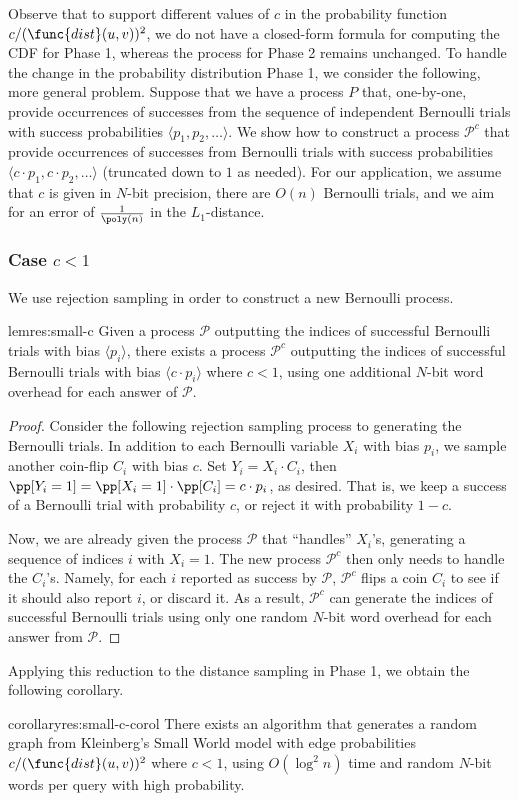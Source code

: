 Observe that to support different values of $c$ in the probability function $c/(\func{dist}(u,v))^2$, we do not have a closed-form formula for computing the CDF for Phase 1, whereas the process for Phase 2 remains unchanged. To handle the change in the probability distribution Phase 1, we consider the following, more general problem. Suppose that we have a process $P$ that, one-by-one, provide occurrences of successes from the sequence of independent Bernoulli trials with success probabilities $\langle p_1, p_2, \ldots \rangle$. We show how to construct a process $\mathcal{P}^c$ that provide occurrences of successes from Bernoulli trials with success probabilities $\langle c\cdot p_1, c\cdot p_2, \ldots\rangle$ (truncated down to $1$ as needed). For our application, we assume that $c$ is given in $N$-bit precision, there are $O(n)$ Bernoulli trials, and we aim for an error of $\frac{1}{\poly(n)}$ in the $L_1$-distance.

\subsubsection{Case $c < 1$}
We use rejection sampling in order to construct a new Bernoulli process.

\begin{restatable}{lem}{res:small-c}
Given a process $\mathcal{P}$ outputting the indices of successful Bernoulli trials with bias $\langle p_i\rangle$, there exists a process $\mathcal{P}^c$ outputting the indices of successful Bernoulli trials with bias $\langle c\cdot p_i\rangle$ where $c<1$,
using one additional $N$-bit word overhead for each answer of $\mathcal{P}$.
\end{restatable}
\begin{proof}
Consider the following rejection sampling process to generating the Bernoulli trials.
In addition to each Bernoulli variable $X_i$ with bias $p_i$, we sample another coin-flip $C_i$ with bias $c$.
Set $Y_i = X_i \cdot C_i$, then $\pp[Y_i = 1] = \pp[X_i = 1]\cdot\pp[C_i] = c\cdot p_i$, as desired.
That is, we keep a success of a Bernoulli trial with probability $c$, or reject it with probability $1-c$.

Now, we are already given the process $\mathcal{P}$ that ``handles'' $X_i$'s, generating a sequence of indices $i$ with $X_i = 1$.
The new process $\mathcal{P}^c$ then only needs to handle the $C_i$'s. Namely, for each $i$ reported as success by $\mathcal{P}$, $\mathcal{P}^c$ flips a coin $C_i$ to see if it should also report $i$, or discard it.
As a result, $\mathcal{P}^c$ can generate the indices of successful Bernoulli trials using only one random $N$-bit word overhead for each answer from $\mathcal{P}$.
\end{proof}
Applying this reduction to the distance sampling in Phase 1, we obtain the following corollary.
\begin{restatable}{corollary}{res:small-c-corol}
There exists an algorithm that generates a random graph from Kleinberg's Small World model with edge probabilities $c/(\func{dist}(u,v))^2$ where $c<1$,
using $O(\log^2 n)$ time and random $N$-bit words per  query with high probability.
\end{restatable}


